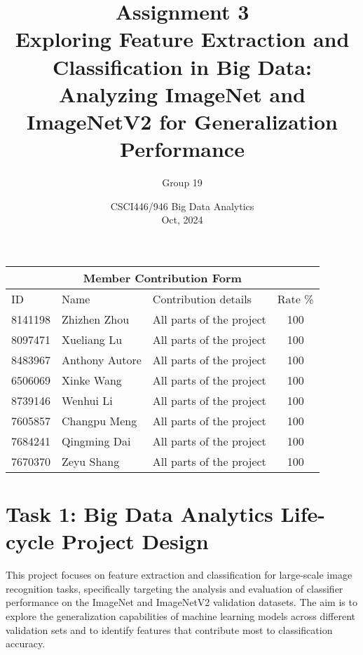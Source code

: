 \documentclass[a4paper,11pt]{article}
\title{Assignment 3\\ Exploring Feature Extraction and Classification in Big Data: Analyzing ImageNet and ImageNetV2 for Generalization Performance}
\author{Group 19}
\date{CSCI446/946 Big Data Analytics\\
Oct, 2024}
\begin{document}
\maketitle
\begin{table}[hbt!]
    \centering
    \begin{tabular}{llp{6cm}c} 
         \multicolumn{4}{c}{\textbf{Member Contribution Form}}\\ \hline 
         ID&  Name&  Contribution details& Rate \% 
\\ \hline 
         8141198&  Zhizhen Zhou& All parts of the project & 100 
\\ 
         8097471&  Xueliang Lu& All parts of the project & 100 
\\  
         8483967&  Anthony Autore& All parts of the project & 100 
\\ 
         6506069&  Xinke Wang& All parts of the project & 100 
\\ 
         8739146&  Wenhui Li& All parts of the project & 100 
\\  
         7605857&  Changpu Meng& All parts of the project & 100 
\\  
         7684241&  Qingming Dai& All parts of the project & 100 
\\  
         7670370&  Zeyu Shang& All parts of the project & 100 
\\ \hline
    \end{tabular}
\end{table}

\onehalfspacing

    \begin{abstract}
   
    \end{abstract}
\newpage
\tableofcontents
\newpage



\section{Task 1: Big Data Analytics Life-cycle Project Design}

This project focuses on feature extraction and classification for large-scale image recognition tasks, specifically targeting the analysis and evaluation of classifier performance on the ImageNet and ImageNetV2 validation datasets. The aim is to explore the generalization capabilities of machine learning models across different validation sets and to identify features that contribute most to classification accuracy.
\end{document}
